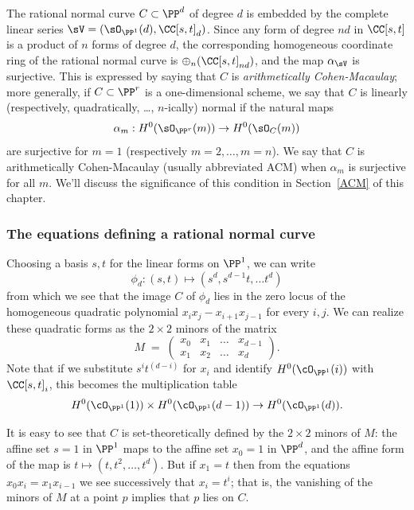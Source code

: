 The rational normal curve $C\subset \PP^d$ of degree $d$ is embedded by the complete linear series
$\sV = (\sO_{\PP^1}(d), \CC[s,t]_d)$. Since any form of degree $nd$ in $\CC[s,t]$ is a product of $n$ forms of degree $d$, 
the corresponding homogeneous coordinate ring of the rational normal curve is 
$\oplus_n(\CC[s,t]_{nd})$, and the map $\alpha_{\sV}$ is surjective. This is expressed by saying
that $C$ is \emph{arithmetically Cohen-Macaulay}; more generally, if $C\subset \PP^r$ is 
a one-dimensional scheme, we say that $C$ is linearly (respectively, quadratically, \dots, $n$-ically) normal
if  the natural maps
$$
\alpha_m: H^0(\sO_{\PP^r}(m)) \to H^0(\sO_{C}(m))
$$
are surjective for  $m=1$ (respectively $m=2,\dots, m=n$). We say that $C$ is arithmetically Cohen-Macaulay
(usually abbreviated ACM)
 when $\alpha_m$ is surjective for all $m$. We'll discuss the significance of this condition in Section~\ref{ACM} of this chapter.



\subsubsection{The equations defining a rational normal curve}

Choosing a basis $s,t$ for the linear forms on $\PP^1$, we can write
$$
\phi_d : (s,t) \mapsto (s^d, s^{d-1}t,\dots t^d)
$$
from which we see that the image $C$ of $\phi_d$ lies in the zero locus of the homogeneous quadratic polynomial $x_i x_j - x_{i+1}x_{j-1}$ for every $i,j$. We can realize these quadratic forms as the $2\times 2$ minors of the matrix
$$
M \; = \; \begin{pmatrix}
x_0 & x_1 & \dots & x_{d-1} \\
x_1 & x_2 & \dots & x_d
\end{pmatrix}.
$$
Note that if we substitute $s^it^{(d-i)}$ for $x_i$ and identify $H^0(\cO_{\PP^1}(i))$ with $\CC[s,t]_i$, this becomes the multiplication table
$$
H^0(\cO_{\PP^1}(1)) \times H^0(\cO_{\PP^1}(d-1)) \to H^0(\cO_{\PP^1}(d)).
$$


It is easy to see that $C$ is set-theoretically defined by the $2\times 2$ minors of $M$: the affine set $s=1$ in $\PP^1$ maps
to the affine set $x_0 = 1$ in $\PP^d$, and the affine form of the map is $t \mapsto (t, t^2, \dots, t^d)$. But if $x_1 = t$ then from 
the equations $x_0x_i = x_1x_{i-1}$ we see successively that $x_i = t^i$; that is, the vanishing of the minors of $M$ at a point $p$
implies that $p$ lies on $C$.

